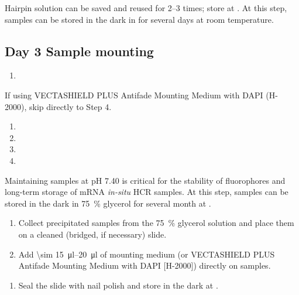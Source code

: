 \documentclass[10pt]{report}
\begin{document}
\bigskip\alert{Hairpin solution can be saved and reused for 2--3 times; store at \minustwenty.}
\alert{At this step, samples can be stored in the dark in \ssct for several days at room temperature.}

\subsection*{Day 3 \textendash{} Sample mounting}

\begin{enumerate}[series = steps]
	\item {}
\end{enumerate}

\bigskip\alert{If using VECTASHIELD\textregistered{} PLUS Antifade Mounting Medium with DAPI (H-2000), skip directly to Step 4.}

\begin{enumerate}[resume = steps]
	\item {}
	\item {}
	\item {}
	\item {}
\end{enumerate}

\bigskip\alert{Maintaining samples at pH 7.40 is critical for the stability of fluorophores and long-term storage of mRNA \textit{in-situ} HCR samples.}
\alert{At this step, samples can be stored in the dark in \qty{75}{\percent} glycerol for several month at \fourdegree.}

\begin{enumerate}[resume = steps]
	\item Collect precipitated samples from the \qty{75}{\percent} glycerol solution and place them on a cleaned (bridged, if necessary) slide.
	\item Add \qtyrange{\sim 15}{20}{\ul} of mounting medium (or VECTASHIELD\textregistered{} PLUS Antifade Mounting Medium with DAPI [H-2000]) directly on samples.
\end{enumerate}

\begin{enumerate}[resume = steps]
	\item	Seal the slide with nail polish and store in the dark at \fourdegree.
\end{enumerate}
\end{document}
